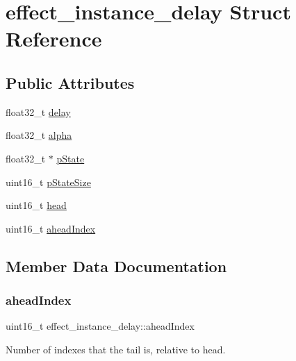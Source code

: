 \hypertarget{structeffect__instance__delay}{}\section{effect\+\_\+instance\+\_\+delay Struct Reference}
\label{structeffect__instance__delay}
\subsection*{Public Attributes}
\begin{DoxyCompactItemize}
\item 
float32\+\_\+t \mbox{\hyperlink{structeffect__instance__delay_acab2f016cebbc0c8ebfebd67ad5e9e21}{delay}}
\item 
float32\+\_\+t \mbox{\hyperlink{structeffect__instance__delay_a1e6678c7e7f3bf4a694b9e0cdedf45f2}{alpha}}
\item 
float32\+\_\+t $\ast$ \mbox{\hyperlink{structeffect__instance__delay_a740e731a7946cb52487046bbd4e17859}{p\+State}}
\item 
uint16\+\_\+t \mbox{\hyperlink{structeffect__instance__delay_af9e69ee7dbef841f178311438b13e0bd}{p\+State\+Size}}
\item 
uint16\+\_\+t \mbox{\hyperlink{structeffect__instance__delay_aa2182f722e542cde916a8945232763a7}{head}}
\item 
uint16\+\_\+t \mbox{\hyperlink{structeffect__instance__delay_a2b59eea7188a9dea765211728d3cf117}{ahead\+Index}}
\end{DoxyCompactItemize}


\subsection{Member Data Documentation}
\mbox{\label{structeffect__instance__delay_a2b59eea7188a9dea765211728d3cf117}} 
\subsubsection{\texorpdfstring{ahead\+Index}{aheadIndex}}
{\footnotesize\ttfamily uint16\+\_\+t effect\+\_\+instance\+\_\+delay\+::ahead\+Index}

Number of indexes that the tail is, relative to head. \mbox{\label{structeffect__instance__delay_a1e6678c7e7f3bf4a694b9e0cdedf45f2}} 

